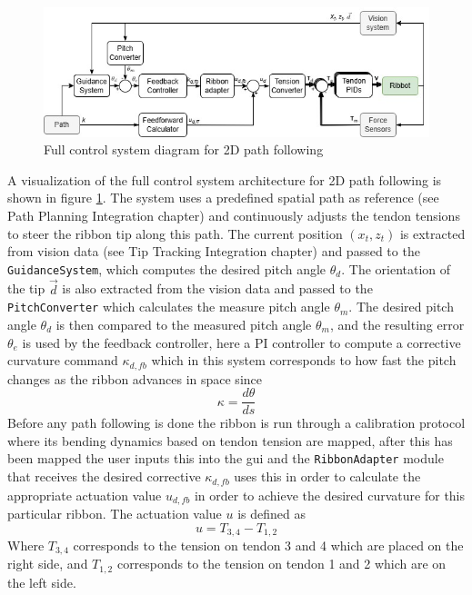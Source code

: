 \begin{figure} [H]
    \centering
    \includegraphics[width=\linewidth]{images/RibbotControl_V2.png}
    \caption{Full control system diagram for 2D path following}
    \label{fig:2Dcontrol}
\end{figure}
A visualization of the full control system architecture for 2D path following is shown in figure \ref{fig:2Dcontrol}. The system uses a predefined spatial path as reference (see Path Planning Integration chapter) and continuously adjusts the tendon tensions to steer the ribbon tip along this path. The current position \((x_t, z_t)\) is extracted from vision data (see Tip Tracking Integration chapter) and passed to the \texttt{GuidanceSystem}, which computes the desired pitch angle \(\theta_d\). The orientation of the tip \(\vec{d}\) is also extracted from the vision data and passed to the \texttt{PitchConverter} which calculates the measure pitch angle \(\theta_m\). The desired pitch angle \(\theta_d\) is then compared to the measured pitch angle \(\theta_m\), and the resulting error \(\theta_e\) is used by the feedback controller, here a PI controller to compute a corrective curvature command \(\kappa_{d,fb}\) which in this system corresponds to how fast the pitch changes as the ribbon advances in space since 
\begin{equation}
    \kappa = \frac{d\theta}{ds}
\end{equation}
Before any path following is done the ribbon is run through a calibration protocol where its bending dynamics based on tendon tension are mapped, after this has been mapped the user inputs this into the gui and the \texttt{RibbonAdapter} module that receives the desired corrective \(\kappa_{d, fb}\) uses this in order to calculate the appropriate actuation value \(u_{d, fb}\) in order to achieve the desired curvature for this particular ribbon. The actuation value \(u\) is defined as 
\begin{equation}
    u = T_{3,4} - T_ {1,2}
\end{equation}
Where \(T_{3,4}\) corresponds to the tension on tendon 3 and 4 which are placed on the right side, and \(T_{1,2}\) corresponds to the tension on tendon 1 and 2 which are on the left side. 
